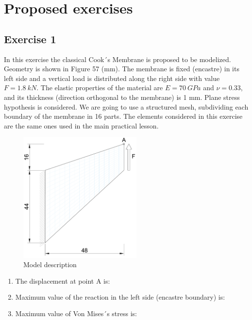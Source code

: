 \section{Proposed exercises}

\subsection{Exercise 1}

In this exercise the classical Cook´s Membrane is proposed to be modelized. Geometry is shown in Figure 57 (mm). The membrane is fixed (encastre) in its left side and a vertical load is distributed along the right side with value $F=1.8\ kN$. The elastic properties of the material are $E=70\ GPa$ and $\nu=0.33$, and its thickness (direction orthogonal to the membrane) is 1 mm. Plane stress hypothesis is considered. We are going to use a structured mesh, subdividing each boundary of the membrane in 16 parts. The elements considered in this exercise are the same ones used in the main practical lesson. 
\begin{figure}[!h]
  \begin{center}
    \includegraphics[width=0.55\textwidth]{./body/images/membrana1}
  \end{center}
  \caption{Model description}
  \label{figu120}
\end{figure}
\begin{enumerate}
\item The displacement at point A is:
  \begin{multicols}{4}
\columnbreak
{}
\columnbreak
{}
\columnbreak
{}
  \end{multicols}
\item Maximum value of the reaction in the left side (encastre boundary) is:
  \begin{multicols}{4}
\columnbreak
{} %
\columnbreak
{}
\columnbreak
{}
  \end{multicols}
\item Maximum value of Von Mises´s stress is:
  \begin{multicols}{4}
\columnbreak
{} %
\columnbreak
{}
\columnbreak
{}
\end{multicols}
\end{enumerate}



